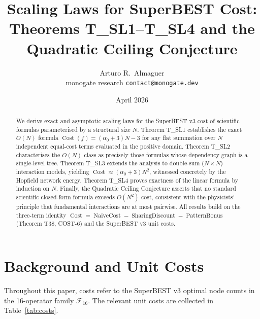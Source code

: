 \documentclass[12pt,a4paper]{article}
\title{Scaling Laws for SuperBEST Cost:\\[6pt]
       \large Theorems T\_SL1--T\_SL4 and the Quadratic Ceiling Conjecture}
\author{Arturo R.\ Almaguer\\
\small monogate research \quad \texttt{contact@monogate.dev}}
\date{April 2026}
\theoremstyle{definition}
\newcommand{\Cost}{\operatorname{Cost}}
\newcommand{\NC}{\operatorname{NaiveCost}}
\newcommand{\SD}{\operatorname{SharingDiscount}}
\newcommand{\PB}{\operatorname{PatternBonus}}
\begin{document}
\maketitle

\begin{abstract}
We derive exact and asymptotic scaling laws for the SuperBEST v3 cost of
scientific formulas parameterised by a structural size $N$.
Theorem T\_SL1 establishes the exact $O(N)$ formula
$\Cost(f) = (\alpha_0 + 3)N - 3$ for any flat summation over $N$
independent equal-cost terms evaluated in the positive domain.
Theorem T\_SL2 characterises the $O(N)$ class as precisely those formulas
whose dependency graph is a single-level tree.
Theorem T\_SL3 extends the analysis to double-sum ($N \times N$) interaction
models, yielding $\Cost \approx (\alpha_0 + 3)N^2$, witnessed concretely by
the Hopfield network energy.
Theorem T\_SL4 proves exactness of the linear formula by induction on $N$.
Finally, the Quadratic Ceiling Conjecture asserts that no standard scientific
closed-form formula exceeds $O(N^2)$ cost, consistent with the physicists'
principle that fundamental interactions are at most pairwise.
All results build on the three-term identity $\Cost = \NC - \SD - \PB$
(Theorem T38, COST-6) and the SuperBEST v3 unit costs.
\end{abstract}

\tableofcontents
\bigskip

\section{Background and Unit Costs}
\label{sec:background}

Throughout this paper, costs refer to the SuperBEST v3 optimal node counts in
the 16-operator family $\mathcal{F}_{16}$.
The relevant unit costs are collected in Table~\ref{tab:costs}.
\end{document}

